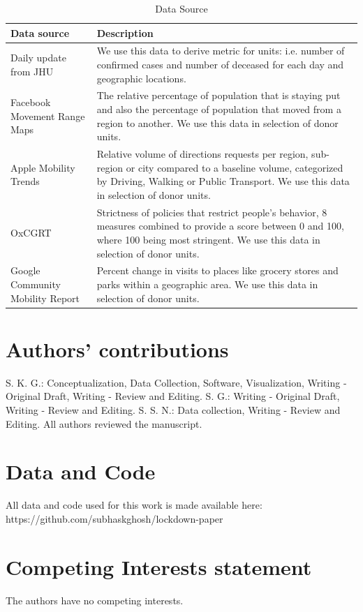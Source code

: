 \documentclass[fleqn,10pt]{wlscirep}
\begin{document}
	\begin{table}
		\centering
		\begin{tabularx}{0.9\textwidth}[t]{p{}X}
			\hline
			\textbf{Data source} &  \textbf{Description}\\ [0.5ex]
			\hline\hline
			Daily update from JHU  \cite{DDG2020}  & We use this data to derive metric for units: i.e. number of confirmed cases and number of deceased for each day and geographic locations.\\ [1ex]
			\hline
			Facebook Movement Range Maps \cite{JM2020} & The relative percentage of population that is staying put and also the percentage of population that moved from a region to another. We use this data in selection of donor units.\\
			\hline
			Apple Mobility Trends\cite{Apple2020} & Relative volume of directions requests per region, sub-region or city compared to a baseline volume, categorized by Driving, Walking or Public Transport. We use this data in selection of donor units.\\
			\hline
			OxCGRT  \cite{HWP2020} &  Strictness of policies that restrict people’s behavior, 8 measures combined to provide a score between 0 and 100, where 100 being most stringent. We use this data in selection of donor units.\\
			\hline
			Google Community Mobility Report \cite{Goog2020} &  Percent change in visits to places like grocery stores and parks within a geographic area. We use this data in selection of donor units.\\ [1ex] 
			\hline
		\end{tabularx}
		\caption{Data Source}
		\label{Table1}
	\end{table}
	 
	\section*{Authors' contributions}
	
	S. K. G.: Conceptualization, Data Collection, Software, Visualization, Writing - Original Draft, Writing - Review and Editing. S. G.: Writing - Original Draft, Writing - Review and Editing. S. S. N.: Data collection, Writing - Review and Editing. All authors reviewed the manuscript.
	
	\section*{Data and Code}
	All data and code used for this work is made available here: https://github.com/subhaskghosh/lockdown-paper
	
	\section*{Competing Interests statement}
	The authors have no competing interests.
	
		
\end{document}
